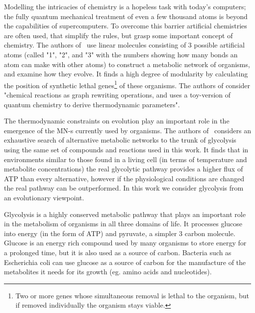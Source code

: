 \documentclass[a4paper,12pt]{article}
\begin{document}
	Modelling the intricacies of chemistry is a hopeless task with today's computers; the fully quantum mechanical treatment of even a few thousand atoms is beyond the capabilities of supercomputers. To overcome this barrier artificial chemistries are often used, that simplify the rules, but grasp some important concept of chemistry\cite{artificialreview}. The authors of~\cite{evolutioncomplex} use linear molecules consisting of 3 possible artificial atoms (called "1", "2", and "3" with the numbers showing how many bonds an atom can make with other atoms) to construct a metabolic network of organisms, and examine how they evolve. It finds a high degree of modularity by calculating the position of synthetic lethal genes\footnote{Two or more genes whose simultaneous removal is lethal to the organism, but if removed individually the organism stays viable.} of these organisms. The authors of \cite{computationalframework} consider "chemical reactions as graph rewriting operations, and uses a toy-version of quantum chemistry to derive thermodynamic parameters". %
	
	The thermodynamic constraints on evolution play an important role in the emergence of the MN-s currently used by organisms. The authors of~\cite{BartekLower} considers an exhaustive search of alternative metabolic networks to the trunk of glycolysis using the same set of compounds and reactions used in this work. It finds that in environments similar to those found in a living cell (in terms of temperature and metabolite concentrations) the real glycolytic pathway provides a higher flux of ATP than every alternative, however if the physiological conditions are changed the real pathway can be outperformed. In this work we consider glycolysis from an evolutionary viewpoint. 


	

Glycolysis is a highly conserved metabolic pathway that plays an important role in the metabolism of organisms in all three domains of life. It processes glucose into energy (in the form of ATP) and pyruvate, a simpler 3 carbon molecule. Glucose is an energy rich compound used by many organisms to store energy for a prolonged time, but it is also used as a source of carbon. Bacteria such as Escherichia coli can use glucose as a source of carbon for the manufacture of the metabolites it needs for its growth (eg. amino acids and nucleotides)\cite[]{principlesofbio}.
\end{document}
